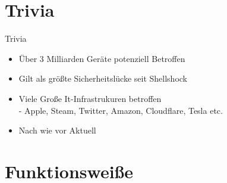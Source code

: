 \documentclass{beamer}
\begin{document}
\section{Trivia}
\begin{frame}{Trivia}
 \begin{itemize}
  \item Über 3 Milliarden Geräte potenziell Betroffen
  \item Gilt als größte Sicherheitslücke seit Shellshock
  \item Viele Große It-Infrastrukuren betroffen\\
  - Apple, Steam, Twitter, Amazon, Cloudflare, Tesla etc.
  \item Nach wie vor Aktuell
  
  
 \end{itemize}

\end{frame}

\section{Funktionsweiße}
\end{document}
